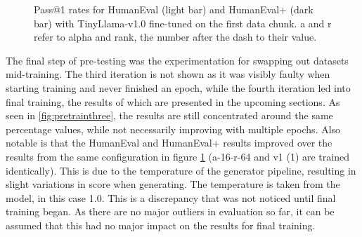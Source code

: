 \begin{figure}[H]
    \centering
    \caption{Pass@1 rates for HumanEval (light bar) and HumanEval+ (dark bar) with TinyLlama-v1.0 fine-tuned on the first data chunk. a and r refer to alpha and rank, the number after the dash to their value.}
    \label{fig:pretraintwo}
\end{figure}

The final step of pre-testing was the experimentation for swapping out datasets mid-training.
The third iteration is not shown as it was visibly faulty when starting training and never finished an epoch, while the fourth iteration led into final training, the results of which are presented in the upcoming sections.
As seen in \ref{fig:pretrainthree}, the results are still concentrated around the same percentage values, while not necessarily improving with multiple epochs.
Also notable is that the HumanEval and HumanEval+ results improved over the results from the same configuration in figure \ref{fig:pretraintwo} (a-16-r-64 and v1 (1) are trained identically).
This is due to the temperature of the generator pipeline, resulting in slight variations in score when generating.
The temperature is taken from the model, in this case 1.0.
This is a discrepancy that was not noticed until final training began.
As there are no major outliers in evaluation so far, it can be assumed that this had no major impact on the results for final training.

